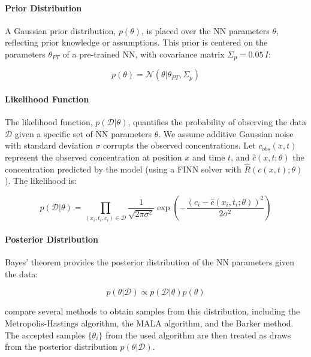 \paragraph{Prior Distribution}

A Gaussian prior distribution, $p(\theta)$, is placed over the NN parameters $\theta$, reflecting prior knowledge or assumptions. This prior is centered on the parameters $\theta_{PT}$ of a pre-trained NN, with covariance matrix $\Sigma_p = 0.05 \, I$:


\begin{equation*}
p(\theta) = \mathcal{N}(\theta | \theta_{PT}, \Sigma_p)
\end{equation*}

\paragraph{Likelihood Function}

The likelihood function, $p(\mathcal{D} | \theta)$, quantifies the probability of observing the data $\mathcal{D}$ given a specific set of NN parameters $\theta$. We assume additive Gaussian noise with standard deviation $\sigma$ corrupts the observed concentrations. Let $c_{obs}(x,t)$ represent the observed concentration at position $x$ and time $t$, and $\hat{c}(x,t; \theta)$ the concentration predicted by the model (using a FINN solver with $\hat{R}(c(x,t);\theta)$). The likelihood is:

\begin{equation}
p(\mathcal{D} | \theta) = \prod_{(x_i, t_i, c_i) \in \mathcal{D}} \frac{1}{\sqrt{2\pi \sigma^2}} \exp \left( -\frac{(c_i - \hat{c}(x_i, t_i; \theta))^2}{2\sigma^2} \right)
\label{eq:likelihood}
\end{equation}

\paragraph{Posterior Distribution}

Bayes' theorem provides the posterior distribution of the NN parameters given the data:

\begin{equation*}
p(\theta | \mathcal{D}) \propto p(\mathcal{D} | \theta) p(\theta)
\end{equation*}

\cite{finn} compare several methods to obtain samples from this distribution, including the Metropolis-Hastings algorithm, the MALA algorithm, and the Barker method. The accepted samples $\{\theta_i\}$ from the used algorithm are then treated as draws from the posterior distribution $p(\theta | \mathcal{D})$.

